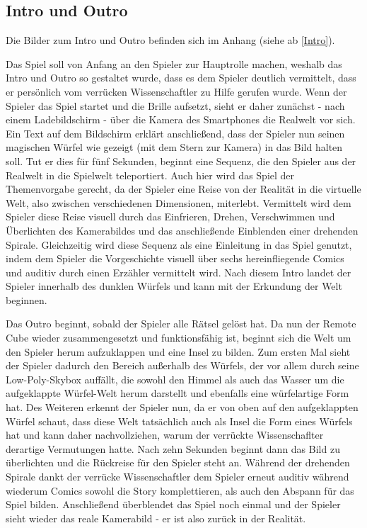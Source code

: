 \subsection{Intro und Outro}

Die Bilder zum Intro und Outro befinden sich im Anhang (siehe ab \ref{Intro}).

Das Spiel soll von Anfang an den Spieler zur Hauptrolle machen, weshalb das Intro und Outro so gestaltet wurde, dass es dem Spieler deutlich vermittelt, dass er persönlich vom verrücken Wissenschaftler zu Hilfe gerufen wurde. Wenn der Spieler das Spiel startet und die Brille aufsetzt, sieht er daher zunächst - nach einem Ladebildschirm - über die Kamera des Smartphones die Realwelt vor sich. Ein Text auf dem Bildschirm erklärt anschließend, dass der Spieler nun seinen magischen Würfel wie gezeigt (mit dem Stern zur Kamera) in das Bild halten soll. Tut er dies für fünf Sekunden, beginnt eine Sequenz, die den Spieler aus der Realwelt in die Spielwelt teleportiert. Auch hier wird das Spiel der Themenvorgabe gerecht, da der Spieler eine Reise von der Realität in die virtuelle Welt, also zwischen verschiedenen Dimensionen, miterlebt. Vermittelt wird dem Spieler diese Reise visuell durch das Einfrieren, Drehen, Verschwimmen und Überlichten des Kamerabildes und das anschließende Einblenden einer drehenden Spirale. Gleichzeitig wird diese Sequenz als eine Einleitung in das Spiel genutzt, indem dem Spieler die Vorgeschichte visuell über sechs hereinfliegende Comics und auditiv durch einen Erzähler vermittelt wird. Nach diesem Intro landet der Spieler innerhalb des dunklen Würfels und kann mit der Erkundung der Welt beginnen.

Das Outro beginnt, sobald der Spieler alle Rätsel gelöst hat. Da nun der Remote Cube wieder zusammengesetzt und funktionsfähig ist, beginnt sich die Welt um den Spieler herum aufzuklappen und eine Insel zu bilden. Zum ersten Mal sieht der Spieler dadurch den Bereich außerhalb des Würfels, der vor allem durch seine Low-Poly-Skybox auffällt, die sowohl den Himmel als auch das Wasser um die aufgeklappte Würfel-Welt herum darstellt und ebenfalls eine würfelartige Form hat. Des Weiteren erkennt der Spieler nun, da er von oben auf den aufgeklappten Würfel schaut, dass diese Welt tatsächlich auch als Insel die Form eines Würfels hat und kann daher nachvollziehen, warum der verrückte Wissenschaflter derartige Vermutungen hatte. Nach zehn Sekunden beginnt dann das Bild zu überlichten und die Rückreise für den Spieler steht an. Während der drehenden Spirale dankt der verrücke Wissenschaftler dem Spieler erneut auditiv während wiederum Comics sowohl die Story komplettieren, als auch den Abspann für das Spiel bilden. Anschließend überblendet das Spiel noch einmal und der Spieler sieht wieder das reale Kamerabild - er ist also zurück in der Realität.


